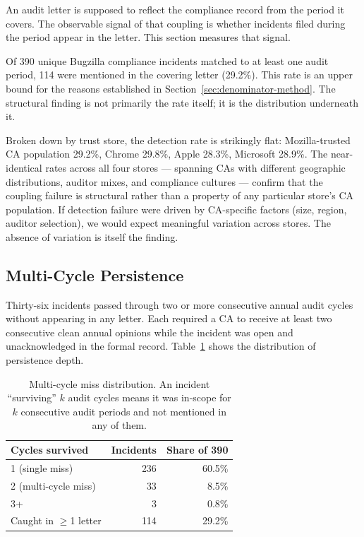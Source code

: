 \documentclass[10pt,twocolumn,letterpaper]{article}
\begin{document}
An audit letter is supposed to reflect the compliance record from the
period it covers. The observable signal of that coupling is whether
incidents filed during the period appear in the letter. This section
measures that signal.

Of 390 unique Bugzilla compliance incidents matched to at least one
audit period, 114 were mentioned in the covering letter (29.2\%). This
rate is an upper bound for the reasons established in
Section~\ref{sec:denominator-method}. The structural finding is not
primarily the rate itself; it is the distribution underneath it.

Broken down by trust store, the detection rate is strikingly flat:
Mozilla-trusted CA population 29.2\%, Chrome 29.8\%, Apple 28.3\%,
Microsoft 28.9\%. The near-identical rates across all four stores ---
spanning CAs with different geographic distributions, auditor mixes,
and compliance cultures --- confirm that the coupling failure is
structural rather than a property of any particular store's CA
population. If detection failure were driven by CA-specific factors
(size, region, auditor selection), we would expect meaningful variation
across stores. The absence of variation is itself the finding.

\subsection{Multi-Cycle Persistence}
\label{sec:multicycle}

Thirty-six incidents passed through two or more consecutive annual
audit cycles without appearing in any letter. Each required a CA to
receive at least two consecutive clean annual opinions while the
incident was open and unacknowledged in the formal record. Table~\ref{tab:multicycle}
shows the distribution of persistence depth.

\begin{table}[t]
\centering
\footnotesize
\setlength{\tabcolsep}{4pt}
\caption{Multi-cycle miss distribution. An incident ``surviving'' $k$
audit cycles means it was in-scope for $k$ consecutive audit periods
and not mentioned in any of them.}
\label{tab:multicycle}
\begin{tabularx}{\columnwidth}{@{}Xrr@{}}
\toprule
Cycles survived & Incidents & Share of 390 \\
\midrule
1 (single miss)        & 236 & 60.5\% \\
2 (multi-cycle miss)   &  33 &  8.5\% \\
3+                     &   3 &  0.8\% \\
Caught in $\geq$1 letter & 114 & 29.2\% \\
\bottomrule
\end{tabularx}
\end{table}
\end{document}
